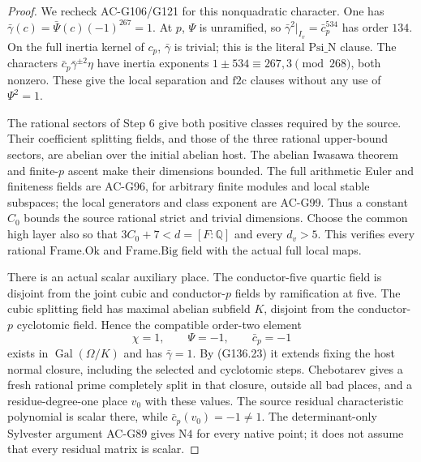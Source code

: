 \begin{proof}
We recheck AC-G106/G121 for this nonquadratic character.
One has \(\bar\gamma(c)=\bar\Psi(c)(-1)^{267}=1\).
At \(p\), \(\Psi\) is unramified, so
\(\bar\gamma^2|_{I_v}=\bar c_p^{534}\) has order \(134\).
On the full inertia kernel of \(c_p\), \(\bar\gamma\)
is trivial; this is the literal \(\mathrm{Psi\_N}\) clause.
The characters \(\bar c_p\bar\gamma^{\pm2}\eta\) have
inertia exponents \(1\pm534\equiv267,3\pmod{268}\), both
nonzero.  These give the local separation and \(\mathrm{f2c}\)
clauses without any use of \(\Psi^2=1\).

The rational sectors of Step 6 give both positive classes
required by the source.  Their coefficient splitting fields,
and those of the three rational upper-bound sectors, are
abelian over the initial abelian host.  The abelian Iwasawa
theorem and finite-\(p\) ascent make their dimensions bounded.
The full arithmetic Euler and finiteness fields are AC-G96,
for arbitrary finite modules and local stable subspaces;
the local generators and class exponent are AC-G99.
Thus a constant \(C_0\) bounds the source rational strict
and trivial dimensions.  Choose the common high layer also
so that \(3C_0+7<d=[F:\mathbb Q]\) and every \(d_v>5\).
This verifies every rational \(\mathrm{Frame.Ok}\) and
\(\mathrm{Frame.Big}\) field with the actual full local maps.

There is an actual scalar auxiliary place.  The conductor-five
quartic field is disjoint from the joint cubic and conductor-\(p\)
fields by ramification at five.  The cubic splitting field has
maximal abelian subfield \(K\), disjoint from the conductor-\(p\)
cyclotomic field.  Hence the compatible order-two element
\[
                 \chi=1,\qquad\Psi=-1,\qquad\bar c_p=-1
 \tag{G136.27}
\]
exists in \(\operatorname{Gal}(\Omega/K)\) and has
\(\bar\gamma=1\).  By (G136.23) it extends fixing the host
normal closure, including the selected and cyclotomic steps.
Chebotarev gives a fresh rational prime completely split in
that closure, outside all bad places, and a residue-degree-one
place \(v_0\) with these values.  The source residual
characteristic polynomial is scalar there, while
\(\bar c_p(v_0)=-1\ne1\).  The determinant-only Sylvester
argument AC-G89 gives \(\mathrm{N4}\) for every native point;
it does not assume that every residual matrix is scalar.


\end{proof}
